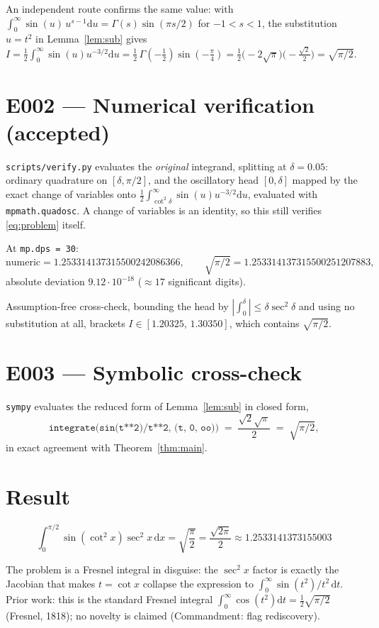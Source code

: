 \documentclass[11pt]{article}
\begin{document}
An independent route confirms the same value: with
$\int_{0}^{\infty}\sin(u)\,u^{s-1}\mathrm{d}u=\Gamma(s)\sin(\pi s/2)$ for
$-1<s<1$, the substitution $u=t^{2}$ in Lemma~\ref{lem:sub} gives
$I=\tfrac12\int_{0}^{\infty}\sin(u)u^{-3/2}\mathrm{d}u
 =\tfrac12\,\Gamma(-\tfrac12)\sin(-\tfrac{\pi}{4})
 =\tfrac12\big(-2\sqrt{\pi}\big)\big(-\tfrac{\sqrt2}{2}\big)=\sqrt{\pi/2}$.

\section{E002 --- Numerical verification (accepted)}

\texttt{scripts/verify.py} evaluates the \emph{original} integrand, splitting at
$\delta=0.05$: ordinary quadrature on $[\delta,\pi/2]$, and the oscillatory head
$[0,\delta]$ mapped by the exact change of variables onto
$\tfrac12\int_{\cot^{2}\delta}^{\infty}\sin(u)u^{-3/2}\mathrm{d}u$, evaluated with
\texttt{mpmath.quadosc}. A change of variables is an identity, so this still
verifies \eqref{eq:problem} itself.

\begin{verification}
At \texttt{mp.dps = 30}:
\[
  \text{numeric} = 1.253314137315500242086366, \qquad
  \sqrt{\pi/2}   = 1.253314137315500251207883,
\]
absolute deviation $9.12\cdot10^{-18}$ ($\approx 17$ significant digits).

Assumption-free cross-check, bounding the head by
$|\int_{0}^{\delta}|\le\delta\sec^{2}\delta$ and using no substitution at all,
brackets $I \in [1.20325,\,1.30350]$, which contains $\sqrt{\pi/2}$.
\end{verification}

\section{E003 --- Symbolic cross-check}

\texttt{sympy} evaluates the reduced form of Lemma~\ref{lem:sub} in closed form,
\[
  \texttt{integrate(sin(t**2)/t**2, (t, 0, oo))} \;=\; \frac{\sqrt{2}\sqrt{\pi}}{2}
  \;=\; \sqrt{\pi/2},
\]
in exact agreement with Theorem~\ref{thm:main}.

\section{Result}

\[
  \boxed{\;\int_{0}^{\pi/2}\sin(\cot^{2}x)\sec^{2}x\,\mathrm{d}x=\sqrt{\frac{\pi}{2}}
  =\frac{\sqrt{2\pi}}{2}\approx 1.2533141373155003\;}
\]

The problem is a Fresnel integral in disguise: the $\sec^{2}x$ factor is exactly
the Jacobian that makes $t=\cot x$ collapse the expression to
$\int_{0}^{\infty}\sin(t^{2})/t^{2}\,\mathrm{d}t$. Prior work: this is the
standard Fresnel integral $\int_{0}^{\infty}\cos(t^{2})\mathrm{d}t=\frac12\sqrt{\pi/2}$
(Fresnel, 1818); no novelty is claimed (Commandment: flag rediscovery).
\end{document}
